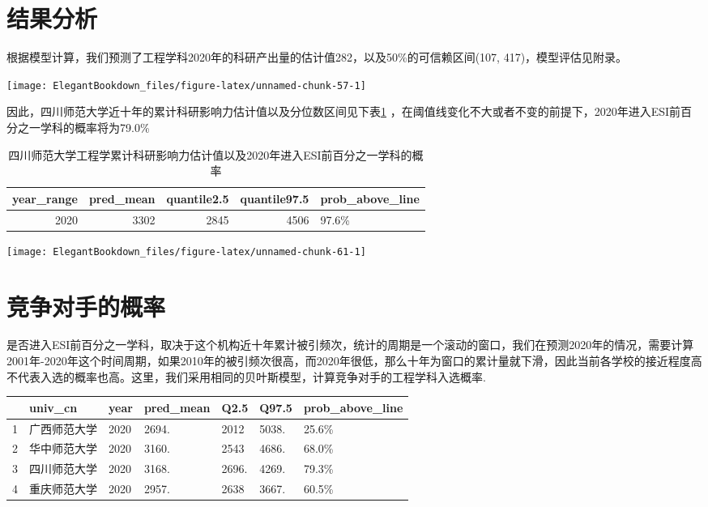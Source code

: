 \documentclass[cn, 11pt, fancy, hide]{elegantbook}
\begin{document}
\hypertarget{ux7ed3ux679cux5206ux6790}{%
\section{结果分析}\label{ux7ed3ux679cux5206ux6790}}

根据模型计算，我们预测了工程学科2020年的科研产出量的估计值282，以及50\%的可信赖区间(107, 417)，模型评估见附录。

\begin{center}\texttt{[image: ElegantBookdown\_files/figure-latex/unnamed-chunk-57-1]} \end{center}

因此，四川师范大学近十年的累计科研影响力估计值以及分位数区间见下表\ref{tab:tabestimate} ，在阈值线变化不大或者不变的前提下，2020年进入ESI前百分之一学科的概率将为79.0\%

\begin{table}[!h]

\caption{\label{tab:tabestimate}四川师范大学工程学累计科研影响力估计值以及2020年进入ESI前百分之一学科的概率}
\centering
\begin{tabular}[t]{rrrrl}
\toprule
year\_range & pred\_mean & quantile2.5 & quantile97.5 & prob\_above\_line\\
\midrule
2020 & 3302 & 2845 & 4506 & 97.6\%\\
\bottomrule
\end{tabular}
\end{table}

\begin{center}\texttt{[image: ElegantBookdown\_files/figure-latex/unnamed-chunk-61-1]} \end{center}

\hypertarget{ux7adeux4e89ux5bf9ux624bux7684ux6982ux7387}{%
\section{竞争对手的概率}\label{ux7adeux4e89ux5bf9ux624bux7684ux6982ux7387}}

是否进入ESI前百分之一学科，取决于这个机构近十年累计被引频次，统计的周期是一个滚动的窗口，我们在预测2020年的情况，需要计算2001年-2020年这个时间周期，如果2010年的被引频次很高，而2020年很低，那么十年为窗口的累计量就下滑，因此当前各学校的接近程度高不代表入选的概率也高。这里，我们采用相同的贝叶斯模型，计算竞争对手的工程学科入选概率.

\begin{longtable}[]{@{}lllllll@{}}
\toprule
& univ\_cn & year & pred\_mean & Q2.5 & Q97.5 & prob\_above\_line\tabularnewline
\midrule
\endhead
1 & 广西师范大学 & 2020 & 2694. & 2012 & 5038. & 25.6\%\tabularnewline
2 & 华中师范大学 & 2020 & 3160. & 2543 & 4686. & 68.0\%\tabularnewline
3 & 四川师范大学 & 2020 & 3168. & 2696. & 4269. & 79.3\%\tabularnewline
4 & 重庆师范大学 & 2020 & 2957. & 2638 & 3667. & 60.5\%\tabularnewline
\bottomrule
\end{longtable}
\end{document}
